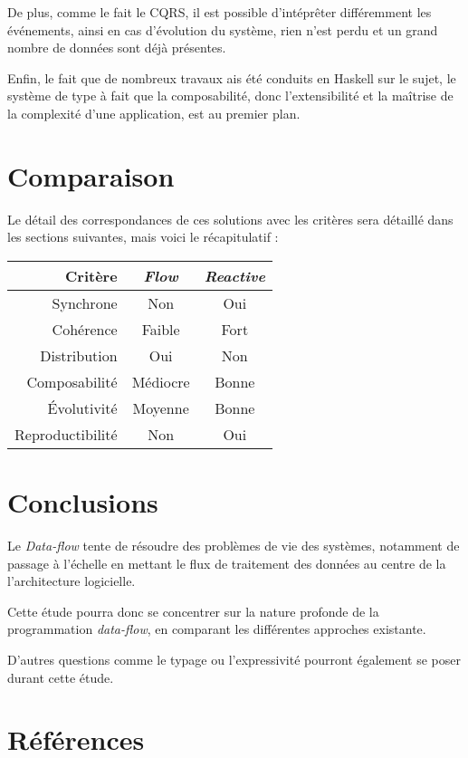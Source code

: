\documentclass{article}
\begin{document}
De plus, comme le fait le CQRS, il est possible d'intéprêter différemment
les événements, ainsi en cas d'évolution du système, rien n'est perdu et
un grand nombre de données sont déjà présentes.

Enfin, le fait que de nombreux travaux ais été conduits en Haskell sur
le sujet, le système de type à fait que la composabilité, donc
l'extensibilité et la maîtrise de la complexité d'une application, est
au premier plan.

\section{Comparaison}
Le détail des correspondances de ces solutions avec les critères sera détaillé
dans les sections suivantes, mais voici le récapitulatif :

\begin{center}
\begin{tabular}{r|c c}
Critère & \emph{Flow} & \emph{Reactive} \\
\hline
Synchrone & Non & Oui \\
Cohérence & Faible & Fort \\
Distribution & Oui & Non \\
Composabilité & Médiocre & Bonne \\
Évolutivité & Moyenne & Bonne \\
Reproductibilité & Non & Oui \\
\end{tabular}
\end{center}

\section{Conclusions}\label{conclusions}

Le \emph{Data-flow} tente de résoudre des problèmes de vie des systèmes,
notamment de passage à l'échelle en mettant le flux de traitement des données
au centre de la l'architecture logicielle.

Cette étude pourra donc se concentrer sur la nature profonde de la
programmation \emph{data-flow}, en comparant les différentes approches
existante.

D'autres questions comme le typage ou l'expressivité pourront également
se poser durant cette étude.


\section{Références}\label{références}


\end{document}
